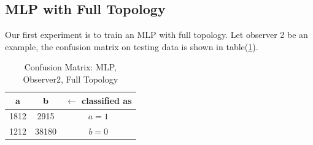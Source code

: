 \documentclass[11pt,a4paper]{article}
\begin{document}
%
%
%
%

%
%
%


%
%
%


\subsection{MLP with Full Topology}

Our first experiment is to train an MLP with full topology. 
Let observer 2 be an example, the confusion matrix on testing 
data is shown in table(\ref{tbl:cm_o2_full}). 

\begin{table}[htb]
	\centering
	\caption{Confusion Matrix: MLP, Observer2, Full Topology}
	\label{tbl:cm_o2_full}
	\begin{tabular}{cc|c}
	\hline
a & b & \textbf{$\leftarrow$ classified as}\\	
	\hline
1812 &  2915 &    $a = 1$ \\
1212 & 38180 &    $b = 0$\\
	\hline
	\end{tabular}
\end{table}
\end{document}
